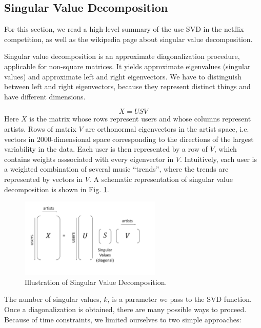 \documentclass[11pt]{article}
\begin{document}
\subsection{Singular Value Decomposition}
For this section, we read a high-level summary of the use SVD in the netflix competition\cite{SVD}, as well as the wikipedia page about singular value decomposition. 

Singular value decomposition is an approximate diagonalization procedure, applicable for non-square matrices. It yields approximate eigenvalues (singular values) and approximate left and right eigenvectors. We have to distinguish between left and right eigenvectors, because they represent distinct things and have different dimensions. 

\begin{equation}
X = USV
\end{equation}
Here $X$ is the matrix whose rows represent users and whose columns represent artists. Rows of matrix $V$ are orthonormal eigenvectors in the artist space, i.e. vectors in 2000-dimensional space corresponding to the directions of the largest variability in the data. Each user is then represented by a row of $V$, which contains weights asssociated with every eigenvector in $V$. Intuitively, each user is a weighted combination of several music ``trends'', where the trends are represented by vectors in $V$. A schematic representation of singular value decomposition is shown in Fig. \ref{SVD}.
\begin{figure}[] 
\centering
        \includegraphics[width=0.6\textwidth]{Plots/SVD.pdf}
        \caption{Illustration of Singular Value Decomposition.}
            \label{SVD}
\end{figure}

The number of singular values, $k$, is a parameter we pass to the SVD function. Once a diagonalization is obtained, there are many possible ways to proceed. Because of time constraints, we limited ourselves to two simple approaches:
\end{document}
